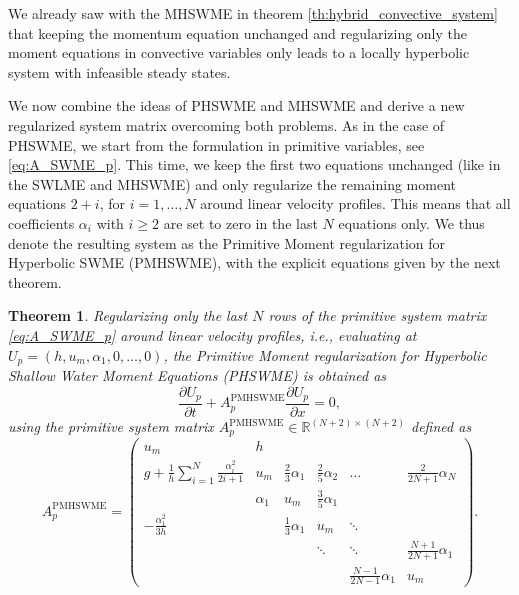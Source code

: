 \documentclass[a4paper, 11pt]{article}
\newtheorem{theorem}{Theorem}
\begin{document}
We already saw with the MHSWME in theorem \ref{th:hybrid_convective_system} that keeping the momentum equation unchanged and regularizing only the moment equations in convective variables only leads to a locally hyperbolic system with infeasible steady states.

We now combine the ideas of PHSWME and MHSWME and derive a new regularized system matrix overcoming both problems. As in the case of PHSWME, we start from the formulation in primitive variables, see \eqref{eq:A_SWME_p}. This time, we keep the first two equations unchanged (like in the SWLME and MHSWME) and only regularize the remaining moment equations $2+i$, for $i=1, \ldots, N$ around linear velocity profiles. This means that all coefficients $\alpha_i$ with $i\geq2$ are set to zero in the last $N$ equations only. We thus denote the resulting system as the Primitive Moment regularization for Hyperbolic SWME (PMHSWME), with the explicit equations given by the next theorem.

\begin{theorem}\label{th:APMHSWME_p}
    Regularizing only the last $N$ rows of the primitive system matrix \eqref{eq:A_SWME_p} around linear velocity profiles, i.e., evaluating at $U_{p}=\left(h,u_m,\alpha_1, 0, \ldots, 0\right)$, the Primitive Moment regularization for Hyperbolic Shallow Water Moment Equations (PHSWME) is obtained as
    \begin{equation}\label{eq:PMHSWME_p}
        \frac{\partial U_{p}}{\partial t} + A^{\textrm{PMHSWME}}_{p} \frac{\partial U_{p}}{\partial x} = 0,
    \end{equation}
    using the primitive system matrix $A^{\textrm{PMHSWME}}_{p} \in \mathbb{R}^{(N+2)\times(N+2)}$ defined as
    \begin{equation}\label{eq:A_PMHSWME_p}
        A^{\textrm{PMHSWME}}_{p} =
        \left(\begin{array}{cccccc}
        u_m & h &  &  &  &  \\
        g + \frac{1}{h} \sum\limits_{i=1}^N \frac{\alpha_i^2}{2i+1} & u_m & \frac{2}{3} \alpha_1 & \frac{2}{5} \alpha_2 & \dots & \frac{2}{2N+1} \alpha_N \\
         & \alpha_1 & u_m & \frac{3}{5} \alpha_1 & &\\
        -\frac{\alpha_1^2}{3h} &   & \frac{1}{3}\alpha_1 & u_m & \ddots & \\
         &  &  & \ddots & \ddots & \frac{N+1}{2N+1}\alpha_1 \\
         &  &  &  & \frac{N-1}{2N-1}\alpha_1 & u_m
        \end{array}\right).
    \end{equation}
\end{theorem}
\end{document}
